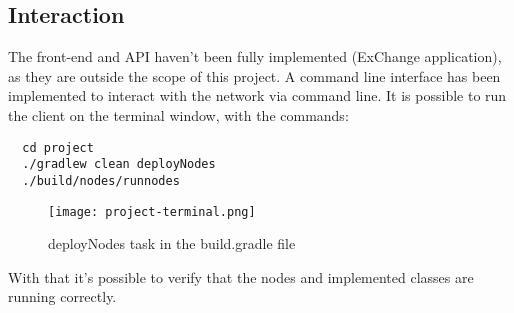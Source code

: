 \clearpage

\subsection{Interaction}
The front-end and API haven't been fully implemented (ExChange application), as they are outside the scope of this project. A command line interface has been implemented to interact with the network via command line. It is possible to run the client on the terminal window, with the commands:
\begin{verbatim}
  cd project
  ./gradlew clean deployNodes
  ./build/nodes/runnodes 
\end{verbatim}

\begin{figure}[h]
    \centering
    \texttt{[image: project-terminal.png]}
    \caption{
        deployNodes task in the build.gradle file
         }
\end{figure}

With that it's possible to verify that the nodes and implemented classes are running correctly.
